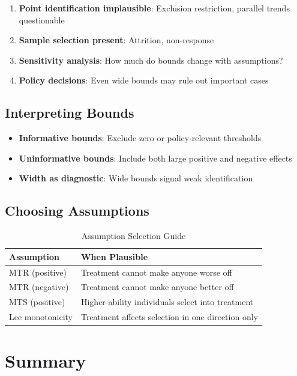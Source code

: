 \begin{enumerate}
    \item \textbf{Point identification implausible}: Exclusion restriction, parallel trends questionable
    \item \textbf{Sample selection present}: Attrition, non-response
    \item \textbf{Sensitivity analysis}: How much do bounds change with assumptions?
    \item \textbf{Policy decisions}: Even wide bounds may rule out important cases
\end{enumerate}

\subsection{Interpreting Bounds}

\begin{itemize}
    \item \textbf{Informative bounds}: Exclude zero or policy-relevant thresholds
    \item \textbf{Uninformative bounds}: Include both large positive and negative effects
    \item \textbf{Width as diagnostic}: Wide bounds signal weak identification
\end{itemize}

\subsection{Choosing Assumptions}

\begin{table}[htbp]
\centering
\caption{Assumption Selection Guide}
\label{tab:assumption_guide}
\begin{tabular}{ll}
\toprule
Assumption & When Plausible \\
\midrule
MTR (positive) & Treatment cannot make anyone worse off \\
MTR (negative) & Treatment cannot make anyone better off \\
MTS (positive) & Higher-ability individuals select into treatment \\
Lee monotonicity & Treatment affects selection in one direction only \\
\bottomrule
\end{tabular}
\end{table}


\section{Summary}
\label{sec:bounds_summary}

